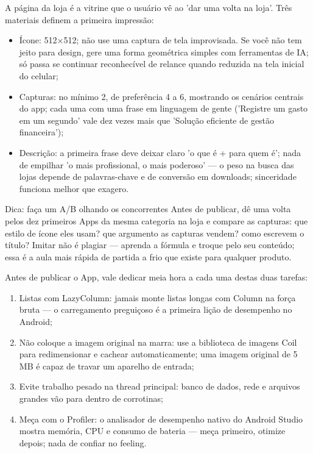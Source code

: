 
A página da loja é a vitrine que o usuário vê ao 'dar uma volta na loja'. Três materiais definem a primeira impressão:

\begin{itemize}
  \item Ícone: 512×512; não use uma captura de tela improvisada. Se você não tem jeito para design, gere uma forma geométrica simples com ferramentas de IA; só passa se continuar reconhecível de relance quando reduzida na tela inicial do celular;
  \item Capturas: no mínimo 2, de preferência 4 a 6, mostrando os cenários centrais do app; cada uma com uma frase em linguagem de gente ('Registre um gasto em um segundo' vale dez vezes mais que 'Solução eficiente de gestão financeira');
  \item Descrição: a primeira frase deve deixar claro 'o que é + para quem é'; nada de empilhar 'o mais profissional, o mais poderoso' — o peso na busca das lojas depende de palavras-chave e de conversão em downloads; sinceridade funciona melhor que exagero.
\end{itemize}

\begin{tcbinfo}{Dica: faça um A/B olhando os concorrentes}
Antes de publicar, dê uma volta pelos dez primeiros Apps da mesma categoria na loja e compare as capturas: que estilo de ícone eles usam? que argumento as capturas vendem? como escrevem o título? Imitar não é plagiar — aprenda a fórmula e troque pelo seu conteúdo; essa é a aula mais rápida de partida a frio que existe para qualquer produto.

\end{tcbinfo}


Antes de publicar o App, vale dedicar meia hora a cada uma destas duas tarefas:


\begin{enumerate}
  \item Listas com LazyColumn: jamais monte listas longas com Column na força bruta — o carregamento preguiçoso é a primeira lição de desempenho no Android;
  \item Não coloque a imagem original na marra: use a biblioteca de imagens Coil para redimensionar e cachear automaticamente; uma imagem original de 5 MB é capaz de travar um aparelho de entrada;
  \item Evite trabalho pesado na thread principal: banco de dados, rede e arquivos grandes vão para dentro de corrotinas;
  \item Meça com o Profiler: o analisador de desempenho nativo do Android Studio mostra memória, CPU e consumo de bateria — meça primeiro, otimize depois; nada de confiar no feeling.
\end{enumerate}

